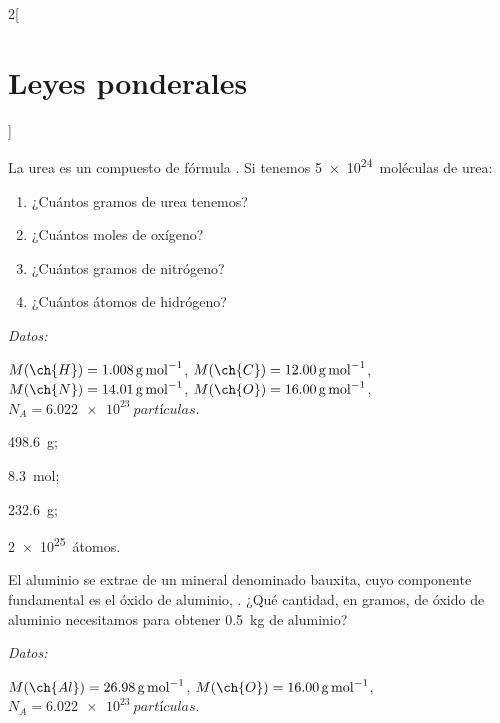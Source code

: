 \documentclass[10pt]{article}
\newenvironment{gexdatos}{
      \vspace{2pt}
      \noindent\textit{Datos:}
    }{\vspace{5pt}}
\begin{document}
\begin{multicols}{2}[
  \section{Leyes ponderales}
  ]
  \begin{exercise}[
      tags    = {termodinámica, entalpía, entalpia de reacción, calor},
      topics  = {química, termoquímica, termodinámica},
      source  = {FQ 1B SAN 2015, p43, e37},
    ]
    La urea es un compuesto de fórmula . Si tenemos \SI{5e24}{moléculas} de urea:
    \begin{enumerate}
      \item ¿Cuántos gramos de urea tenemos?
      \item ¿Cuántos moles de oxígeno?
      \item ¿Cuántos gramos de nitrógeno?
      \item ¿Cuántos átomos de hidrógeno?
    \end{enumerate}

    \begin{gexdatos}
      \( M(\ch{H}) = \SI{1.008}{\gram\per\mole} \),
      \( M(\ch{C}) = \SI{12.00}{\gram\per\mole} \),
      \( M(\ch{N}) = \SI{14.01}{\gram\per\mole} \),
      \( M(\ch{O}) = \SI{16.00}{\gram\per\mole} \),
      \( N_A = \SI{6.022e23}{partículas}\).
    \end{gexdatos}
  \end{exercise}

  \begin{solution}
    \begin{enumerate*}
      \item \SI{498,6}{\gram}; \item \SI{8,3}{\mole}; \item \SI{232,6}{\gram}; \item \SI{2e25}{átomos}.
    \end{enumerate*}
  \end{solution}




  \begin{exercise}[
      tags    = {termodinámica, entalpía, entalpia de reacción, calor},
      topics  = {química, termoquímica, termodinámica},
      source  = {FQ 1B SAN 2015, p43, e39},
    ]
    El aluminio se extrae de un mineral denominado bauxita,
    cuyo componente fundamental es el óxido de aluminio,
    . ¿Qué cantidad, en gramos, de óxido de aluminio
    necesitamos para obtener \SI{0.5}{\kilo\gram} de aluminio?

    \begin{gexdatos}
      \( M(\ch{Al}) = \SI{26.98}{\gram\per\mole} \),
      \( M(\ch{O}) = \SI{16.00}{\gram\per\mole} \),
      \( N_A = \SI{6.022e23}{partículas}\).
    \end{gexdatos}
  \end{exercise}


\end{multicols}
\end{document}
